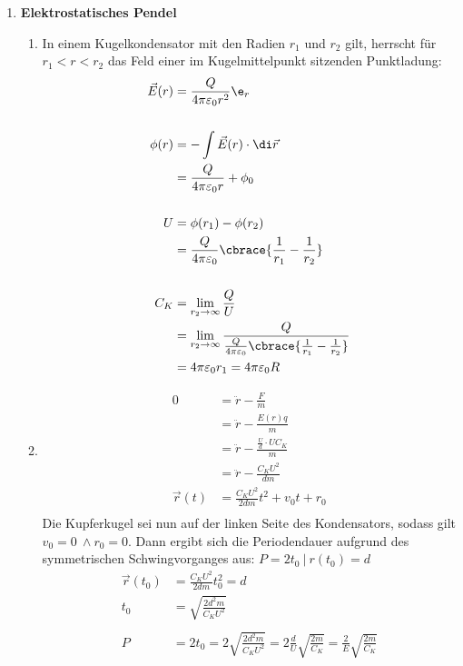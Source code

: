 \documentclass[11pt,letterpaper]{article}
\begin{document}

\begin{enumerate}
    \item \textbf{Elektrostatisches Pendel}
        \begin{enumerate}
            \item
            In einem Kugelkondensator mit den Radien $r_1$ und 
            $r_2$ gilt, herrscht für  $r_1<r<r_2$ das Feld einer 
            im Kugelmittelpunkt sitzenden Punktladung:   
            \begin{align*}
                \vec{E}(r) &= \frac{Q}{4 \pi \varepsilon_0 r^2}\e_{r}\\
                \\
                \phi(r) &= - \int \vec{E}(r) \cdot \di \vec{r}\\
                &= \frac{Q}{4 \pi \varepsilon_0 r} + \phi_0\\
                \\
                U &= \phi(r_1) - \phi(r_2)\\
                &= \frac{Q}{4 \pi \varepsilon_0} \cbrace{\frac{1}{r_1}-\frac{1}{r_2}}\\
                \\
                C_K &= \lim_{r_2\to \infty}\frac{Q}{U}\\
                &= \lim_{r_2\to \infty}\frac{Q}{\frac{Q}{4 \pi \varepsilon_0} \cbrace{\frac{1}{r_1}-\frac{1}{r_2}}}\\
                &= 4 \pi \varepsilon_0 r_1 = 4 \pi \varepsilon_0 R \\
            \end{align*}

            \item
            \begin{align*}
                0 &= \ddot{r} - \frac{F}{m}\\
                &= \ddot{r} - \frac{E(r) q}{m}\\
                &= \ddot{r} - \frac{\frac{U}{d} \cdot U C_K}{m}\\
                &= \ddot{r} - \frac{C_K U^2}{d m}\\
                \vec{r}(t) &= \frac{C_K U^2}{2 d m}t^2 + v_0 t + r_0\\
            \end{align*}
            Die Kupferkugel sei nun auf der linken Seite des Kondensators, 
            sodass gilt $v_0=0\ \land r_0=0$. Dann ergibt sich die Periodendauer
            aufgrund des symmetrischen Schwingvorganges aus: $P = 2 t_0\ |\ r(t_0)=d $
            \begin{align*}
                \vec{r}(t_0) &= \frac{C_K U^2}{2 d m}t_0^2 = d\\
                t_0 &= \sqrt{\frac{2d^2 m}{C_K U^2}}\\
                \\
                P &= 2 t_0 = 2\sqrt{\frac{2d^2 m}{C_K U^2}} 
                = 2 \frac{d}{U}\sqrt{\frac{2m}{C_K}}
                = \frac{2}{E}\sqrt{\frac{2m}{C_K}}
            \end{align*}
        \end{enumerate}


\end{enumerate}
\end{document}
